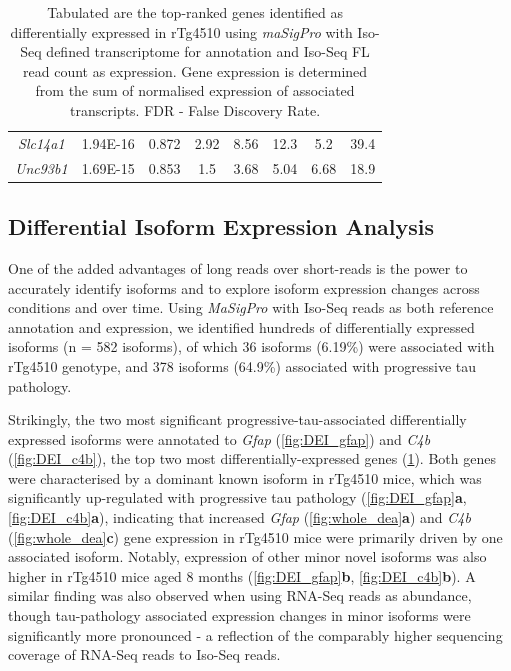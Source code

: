 \begin{table}[!htp]
\begin{tabularx}{0.96\textwidth}{cccccccc}
		\textit{Slc14a1}      & 1.94E-16             & 0.872              & 2.92                                                                                       & 8.56          & 12.3         & 5.2            & 39.4          \\
		\textit{Unc93b1}      & 1.69E-15             & 0.853              & 1.5                                                                                        & 3.68          & 5.04         & 6.68           & 18.9          \\ \bottomrule
	\end{tabularx}
	\caption[Top-ranked differentially expressed genes associated with rTg4510]%
	{Tabulated are the top-ranked genes identified as differentially expressed in rTg4510 using \textit{maSigPro} with Iso-Seq defined transcriptome for annotation and Iso-Seq FL read count as expression. Gene expression is determined from the sum of normalised expression of associated transcripts. FDR - False Discovery Rate. }
	\label{tab:dea_wholemouse}
\end{table}




\clearpage
\subsection{Differential Isoform Expression Analysis}
One of the added advantages of long reads over short-reads is the power to accurately identify isoforms and to explore isoform expression changes across conditions and over time. Using \textit{MaSigPro} with Iso-Seq reads as both reference annotation and expression, we identified hundreds of differentially expressed isoforms (n = 582 isoforms), of which 36 isoforms (6.19\%) were associated with rTg4510 genotype, and 378 isoforms (64.9\%) associated with progressive tau pathology. 

Strikingly, the two most significant progressive-tau-associated differentially expressed isoforms were annotated to \textit{Gfap} (\cref{fig:DEI_gfap}) and \textit{C4b} (\cref{fig:DEI_c4b}), the top two most differentially-expressed genes (\cref{tab:dea_wholemouse}). Both genes were characterised by a dominant known isoform in rTg4510 mice, which was significantly up-regulated with progressive tau pathology (\cref{fig:DEI_gfap}\textbf{a}, \cref{fig:DEI_c4b}\textbf{a}), indicating that increased \textit{Gfap} (\cref{fig:whole_dea}\textbf{a}) and \textit{C4b} (\cref{fig:whole_dea}\textbf{c}) gene expression in rTg4510 mice were primarily driven by one associated isoform. Notably, expression of other minor novel isoforms was also higher in rTg4510 mice aged 8 months (\cref{fig:DEI_gfap}\textbf{b}, \cref{fig:DEI_c4b}\textbf{b}). A similar finding was also observed when using RNA-Seq reads as abundance, though tau-pathology associated expression changes in minor isoforms were significantly more pronounced - a reflection of the comparably higher sequencing coverage of RNA-Seq reads to Iso-Seq reads. 

